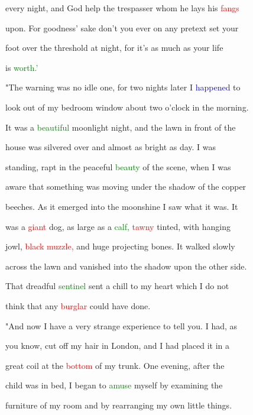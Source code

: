  every night, and \textcolor{BurntOrange}{God} help the trespasser whom he lays his \textcolor{red}{fangs}

 upon. For \textcolor{BurntOrange}{goodness'} sake don't you ever on any pretext set your

 foot over the threshold at night, for it's as much as your life

 is \textcolor{green}{worth.'}



 "The \textcolor{BurntOrange}{warning} was no idle one, for two nights later I \textcolor{blue}{happened} to

 look out of my bedroom window about two o'clock in the morning.

 It was a \textcolor{green}{beautiful} moonlight night, and the lawn in front of the

 house was silvered over and almost as bright as day. I was

 standing, \textcolor{BurntOrange}{rapt} in the \textcolor{BurntOrange}{peaceful} \textcolor{green}{beauty} of the scene, when I was

 aware that something was moving under the shadow of the copper

 beeches. As it emerged into the moonshine I saw what it was. It

 was a \textcolor{red}{giant} dog, as large as a \textcolor{green}{calf,} \textcolor{red}{tawny} tinted, with hanging

 jowl, \textcolor{red}{black} \textcolor{red}{muzzle,} and huge projecting bones. It walked slowly

 across the lawn and \textcolor{BurntOrange}{vanished} into the shadow upon the other side.

 That \textcolor{BurntOrange}{dreadful} \textcolor{green}{sentinel} sent a chill to my heart which I do not

 think that any \textcolor{red}{burglar} could have done.



 "And now I have a very strange experience to tell you. I had, as

 you know, cut off my hair in London, and I had placed it in a

 great coil at the \textcolor{red}{bottom} of my trunk. One evening, after the

 \textcolor{BurntOrange}{child} was in bed, I began to \textcolor{green}{amuse} myself by examining the

 furniture of my room and by rearranging my own little things.

